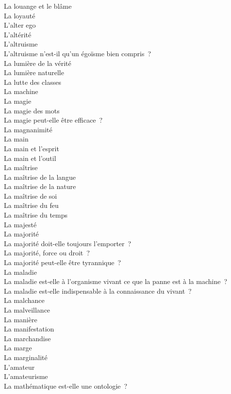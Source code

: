 \documentclass[a4paper,12pt]{article}
\begin{document}
La louange et le blâme \\
La loyauté \\
L'alter ego \\
L'altérité \\
L'altruisme \\
L'altruisme n'est-il qu'un égoïsme bien compris ? \\
La lumière de la vérité \\
La lumière naturelle \\
La lutte des classes \\
La machine \\
La magie \\
La magie des mots \\
La magie peut-elle être efficace ? \\
La magnanimité \\
La main \\
La main et l'esprit \\
La main et l'outil \\
La maîtrise \\
La maîtrise de la langue \\
La maîtrise de la nature \\
La maîtrise de soi \\
La maîtrise du feu \\
La maîtrise du temps \\
La majesté \\
La majorité \\
La majorité doit-elle toujours l'emporter ? \\
La majorité, force ou droit ? \\
La majorité peut-elle être tyrannique ? \\
La maladie \\
La maladie est-elle à l'organisme vivant ce que la panne est à la machine ? \\
La maladie est-elle indispensable à la connaissance du vivant ? \\
La malchance \\
La malveillance \\
La manière \\
La manifestation \\
La marchandise \\
La marge \\
La marginalité \\
L'amateur \\
L'amateurisme \\
La mathématique est-elle une ontologie ? \\
\end{document}
